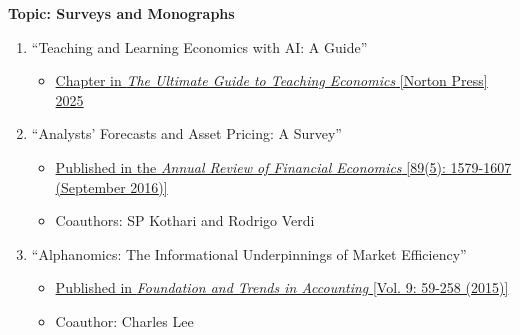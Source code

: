 \documentclass[11pt]{article}
\begin{document}
\medskip
\vspace*{.1in}
{\bf Topic: Surveys and Monographs} \\
\vspace*{-.2in}
\begin{enumerate}

\item ``Teaching and Learning Economics with AI: A Guide''
\begin{itemize}
\vspace*{-.07in}
	\item \href{https://seagull.wwnorton.com/essentialecon3}{Chapter in {\it The Ultimate Guide to Teaching Economics} [Norton Press] 2025 }
\end{itemize}

\item ``Analysts' Forecasts and Asset Pricing: A Survey''
\begin{itemize}
\vspace*{-.07in}
	\item \href{http://www.annualreviews.org/doi/abs/10.1146/annurev-financial-121415-032930?src=recsys}{Published in the {\it Annual Review of Financial Economics} [89(5): 1579-1607 (September 2016)] }
\vspace*{-.07in}
	\item Coauthors: SP Kothari and Rodrigo Verdi
\end{itemize}

\vskip 0.17cm

\item ``Alphanomics: The Informational Underpinnings of Market Efficiency''
\begin{itemize}
\vspace*{-.07in}
	\item \href{http://www.nowpublishers.com/article/Details/ACC-022}{Published in {\it Foundation and Trends in Accounting} [Vol. 9: 59-258 (2015)]}
\vspace*{-.07in}
	\item Coauthor: Charles Lee
\end{itemize}


\end{enumerate}
\end{document}
